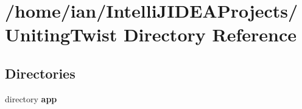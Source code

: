\section{/home/ian/\+Intelli\+J\+I\+D\+E\+A\+Projects/\+Uniting\+Twist Directory Reference}
\label{dir_f07aa82354de6bca39dec16f4abd6cf8}
\subsection*{Directories}
\begin{DoxyCompactItemize}
\item 
directory \textbf{ app}
\end{DoxyCompactItemize}
